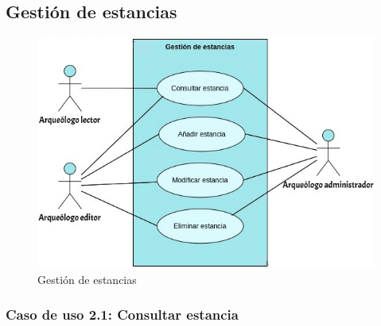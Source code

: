 \subsection{Gestión de estancias}
    \begin{figure}[H]
        \centering
        \includegraphics[scale=0.40]{imagenes/diagramas CU/room-UC.png}
        \caption{Gestión de estancias}
        \label{fig:room-management}
    \end{figure}

\subsubsection{Caso de uso 2.1: Consultar estancia}

